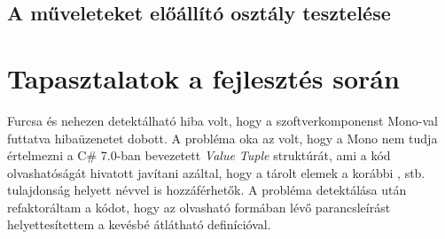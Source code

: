 \subsection{A műveleteket előállító osztály tesztelése}


\section{Tapasztalatok a fejlesztés során}

Furcsa és nehezen detektálható hiba volt, hogy a szoftverkomponenst Mono-val futtatva  hibaüzenetet dobott. A probléma oka az volt, hogy a Mono nem tudja értelmezni a C\# 7.0-ban bevezetett \textit{Value Tuple} struktúrát, ami a kód olvashatóságát hivatott javítani azáltal, hogy a tárolt elemek a korábbi ,  stb. tulajdonság helyett névvel is hozzáférhetők. A probléma detektálása után refaktoráltam a kódot, hogy az olvasható  formában lévő parancsleírást helyettesítettem a kevésbé átlátható  definícióval. \\